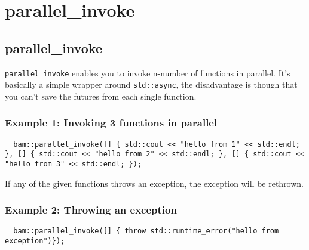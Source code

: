 \documentclass[11pt, a4paper]{article}
\begin{document}
\section{parallel\_invoke}
\subsection{parallel\_invoke}

\texttt{parallel\_invoke} enables you to invoke n-number of functions in parallel. It's basically a simple wrapper around \texttt{std::async}, the disadvantage is though that you can't save the futures from each single function.

\subsubsection{Example 1: Invoking 3 functions in parallel}

\begin{lstlisting}
  bam::parallel_invoke([] { std::cout << "hello from 1" << std::endl; }, [] { std::cout << "hello from 2" << std::endl; }, [] { std::cout << "hello from 3" << std::endl; });
\end{lstlisting}

If any of the given functions throws an exception, the exception will be rethrown.

\subsubsection{Example 2: Throwing an exception}

\begin{lstlisting}
  bam::parallel_invoke([] { throw std::runtime_error("hello from exception")});
\end{lstlisting}
\end{document}
